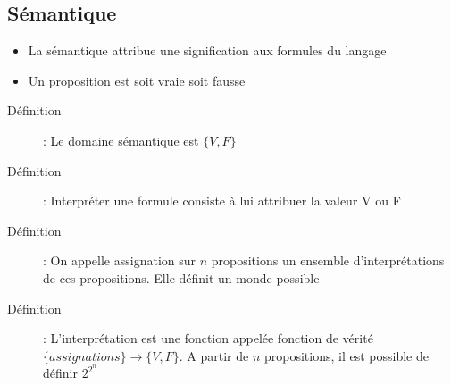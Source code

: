 \documentclass[10pt,a4paper]{article}
\begin{document}
	\subsection{Sémantique}
		\begin{itemize}
			\item La sémantique attribue une signification aux formules du langage
			\item Un proposition est soit vraie soit fausse
		\end{itemize}
		\begin{description}
			\item[Définition]: Le domaine sémantique est $\{V, F\}$
			\item[Définition]: Interpréter une formule consiste à lui attribuer la valeur V ou F
			\item[Définition]: On appelle assignation sur $n$ propositions un ensemble d'interprétations de ces propositions. Elle définit un monde possible
			\item[Définition]: L'interprétation est une fonction appelée fonction de vérité $\{assignations\}\longrightarrow\{V,F\}$. A partir de $n$ propositions, il est possible de définir $2^{2^n}$
		\end{description}
\end{document}
